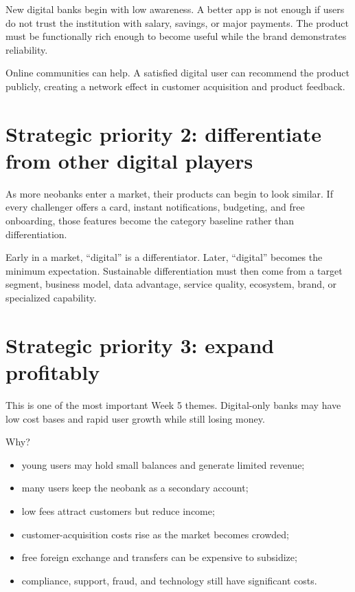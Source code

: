New digital banks begin with low awareness. A better app is not enough if users do not trust the institution with salary, savings, or major payments. The product must be functionally rich enough to become useful while the brand demonstrates reliability.

Online communities can help. A satisfied digital user can recommend the product publicly, creating a network effect in customer acquisition and product feedback.

\section{Strategic priority 2: differentiate from other digital players}

As more neobanks enter a market, their products can begin to look similar. If every challenger offers a card, instant notifications, budgeting, and free onboarding, those features become the category baseline rather than differentiation.

\begin{intuition}
Early in a market, ``digital'' is a differentiator. Later, ``digital'' becomes the minimum expectation. Sustainable differentiation must then come from a target segment, business model, data advantage, service quality, ecosystem, brand, or specialized capability.
\end{intuition}

\section{Strategic priority 3: expand profitably}

This is one of the most important Week 5 themes. Digital-only banks may have low cost bases and rapid user growth while still losing money.

Why?

\begin{itemize}
  \item young users may hold small balances and generate limited revenue;
  \item many users keep the neobank as a secondary account;
  \item low fees attract customers but reduce income;
  \item customer-acquisition costs rise as the market becomes crowded;
  \item free foreign exchange and transfers can be expensive to subsidize;
  \item compliance, support, fraud, and technology still have significant costs.
\end{itemize}


